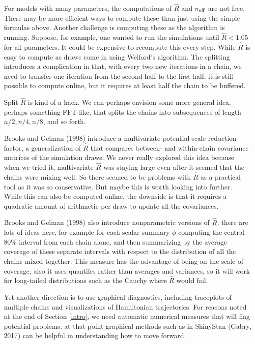 \documentclass[11pt]{article}
\begin{document}
For models with many parameters, the computations of $\widehat{R}$ and $n_{\rm eff}$ are not free.  There may be more efficient ways to compute these than just using the simple formulas above.  Another challenge is computing these as the algorithm is running.  Suppose, for example, one wanted to run the simulations until $\widehat{R}<1.05$ for all parameters.  It could be expensive to recompute this every step.  While $\widehat{R}$ is easy to compute as draws come in using Welford's algorithm.  The splitting introduces a complication in that, with every two new iterations in a chain, we need to transfer one iteration from the second half to the first half;  it is still possible to compute online, but it requires at least half the chain to be buffered.

Split $\widehat{R}$ is kind of a hack.  We can perhaps envision some more general idea, perhaps something FFT-like, that splits the chains into subsequences of length $n/2, n/4, n/8$, and so forth.

Brooks and Gelman (1998) introduce a multivariate potential scale reduction factor, a generalization of $\widehat{R}$ that compares between- and within-chain covariance matrices of the simulation draws.  We never really explored this idea because when we tried it, multivariate $\widehat{R}$ was staying large even after it seemed that the chains were mixing well.  So there seemed to be problems with $\widehat{R}$ as a practical tool as it was so conservative.  But maybe this is worth looking into further.  While this can also be computed online, the downside is that it requires a quadratic amount of arithmetic per draw to update all the covariances.

Brooks and Gelman (1998) also introduce nonparametric versions of $\widehat{R}$; there are lots of ideas here, for example for each scalar summary $\phi$ computing the central 80\% interval from each chain alone, and then summarizing by the average coverage of these separate intervals with respect to the distribution of all the chains mixed together.  This measure has the advantage of being on the scale of coverage; also it uses quantiles rather than averages and variances, so it will work for long-tailed distributions such as the Cauchy where $\widehat{R}$ would fail.

Yet another direction is to use graphical diagnostics, including traceplots of multiple chains and visualizations of Hamiltonian trajectories.  For reasons noted at the end of Section \ref{intro}, we need automatic numerical measures that will flag potential problems; at that point graphical methods such as in ShinyStan (Gabry, 2017) can be helpful in understanding how to move forward.
\end{document}
